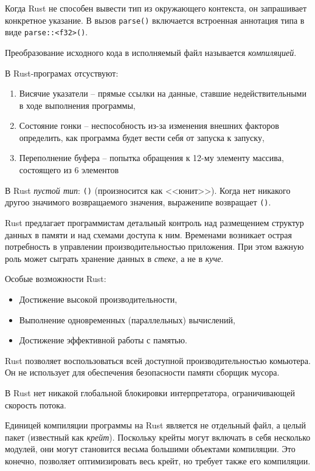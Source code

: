\documentclass[%
	11pt,
	a4paper,
	utf8,
		]{article}
\begin{document}
Когда Rust не способен вывести тип из окружающего контекста, он запрашивает конкретное указание. В вызов \verb|parse()| включается встроенная аннотация типа в виде \verb|parse::<f32>()|.

Преобразование исходного кода в исполняемый файл называется \emph{компиляцией}.

В Rust-програмах отсуствуют:
\begin{enumerate}
	\item Висячие указатели -- прямые ссылки на данные, ставшие недействительными в ходе выполнения программы,
	
	\item Состояние гонки -- неспособность из-за изменения внешних факторов определить, как программа будет вести себя от запуска к запуску,
	
	\item Переполнение буфера -- попытка обращения к 12-му элементу массива, состоящего из 6 элементов
\end{enumerate}

В Rust \emph{пустой тип}: \texttt{()} (произносится как <<юнит>>). Когда нет никакого другоо значимого возвращаемого значения, выраженипе возвращает \texttt{()}.

Rust предлагает программистам детальный контроль над размещением структур данных в памяти и над схемами доступа к ним. Временами возникает острая потребность в управлении производительностью приложения. При этом важную роль может сыграть хранение данных в \emph{стеке}, а не в \emph{куче}. 
  
Особые возможности Rust:
\begin{itemize}
	\item Достижение высокой производительности,
	
	\item Выполнение одновременных (параллельных) вычислений,
	
	\item Достижение эффективной работы с памятью.
\end{itemize}

Rust позволяет воспользоваться всей доступной производительностью комьютера. Он не использует для обеспечения безопасности памяти сборщик мусора.

В Rust нет никакой глобальной блокировки интерпретатора, ограничивающей скорость потока.

Единицей компиляции программы на Rust является не отдельный файл, а целый пакет (известный как \emph{крейт}). Поскольку крейты могут включать в себя несколько модулей, они могут становится весьма большими объектами компиляции. Это конечно, позволяет оптимизировать весь крейт, но требует также его компиляции.
\end{document}
